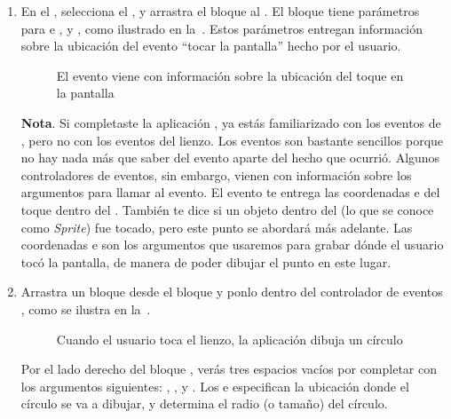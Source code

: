 \begin{enumerate}

\item En el \blockEditor, selecciona el , y
  arrastra el bloque  al \viewer. El
  bloque tiene parámetros para  e ,
  y , como ilustrado en
  la~. Estos parámetros entregan información sobre
  la ubicación del evento ``tocar la pantalla'' hecho por el usuario.

\begin{figure}[H]
\centering
\caption{El evento viene con información sobre la ubicación del toque
  en la pantalla}
\label{fig:PaintPot5}
\end{figure}

\textbf{Nota}. Si completaste la aplicación , ya
estás familiarizado con los eventos de , pero no
con los eventos del lienzo. Los eventos  son
bastante sencillos porque no hay nada más que saber del evento aparte
del hecho que ocurrió. Algunos controladores de eventos, sin embargo,
vienen con información sobre los argumentos para llamar al evento. El
evento  te entrega las
coordenadas  e  del toque dentro del
. También te dice si un objeto dentro del
 (lo que se conoce como \emph{Sprite}) fue
tocado, pero este punto se abordará más adelante. Las
coordenadas  e  son los argumentos que
usaremos para grabar dónde el usuario tocó la pantalla, de manera de
poder dibujar el punto en este lugar.

\item Arrastra un bloque  desde
  el bloque y ponlo dentro del controlador de eventos
  , como se ilustra en
  la~.

\begin{figure}[H]
\centering
\caption{Cuando el usuario toca el lienzo, la aplicación dibuja un círculo}
\label{fig:PaintPot6}
\end{figure}

Por el lado derecho del bloque
, verás tres espacios vacíos
por completar con los argumentos
siguientes: , ,
y . Los  e  especifican la
ubicación donde el círculo se va a dibujar, y  determina
el radio (o tamaño) del círculo.


\end{enumerate}
